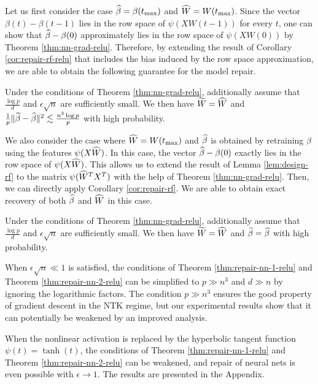 Let us first consider the case $\widehat{\beta}=\beta(t_{\max})$ and $\widehat{W}=W(t_{\max})$. Since the vector $\beta(t)-\beta(t-1)$ lies in the row space of $\psi(XW(t-1))$ for every $t$, one can show that $\widehat{\beta}-\beta(0)$ approximately lies in the row space of $\psi(XW(0))$ by Theorem \ref{thm:nn-grad-relu}. Therefore, by extending the result of Corollary \ref{cor:repair-rf-relu} that includes the bias induced by the row space approximation, we are able to obtain the following guarantee for the model repair.

\vskip10pt
\begin{thm}\label{thm:repair-nn-1-relu}
Under the conditions of Theorem \ref{thm:nn-grad-relu}, additionally assume that $\frac{\log p}{d}$ and $\epsilon\sqrt{n}$ are sufficiently small. We then have $\widetilde{W}=\widehat{W}$ and $\frac{1}{p}\|\widetilde{\beta}-\widehat{\beta}\|^2 \lesssim \frac{n^3\log p}{p}$ with high probability.
\end{thm}


We also consider the case where $\widehat{W}=W(t_{\max})$ and $\widehat{\beta}$ is obtained by retraining $\beta$ using the features $\psi(X\widehat{W})$. In this case, the vector $\widehat{\beta}-\beta(0)$ exactly lies in the row space of $\psi(X\widehat{W})$. This allows us to extend the result of Lemma \ref{lem:design-rf} to the matrix $\psi(\widehat{W}^TX^T)$ with the help of Theorem \ref{thm:nn-grad-relu}. Then, we can directly apply Corollary \ref{cor:repair-rf}. We are able to obtain exact recovery of both $\widehat{\beta}$ and $\widehat{W}$ in this case.

\vskip10pt
\begin{thm}\label{thm:repair-nn-2-relu}
Under the conditions of Theorem \ref{thm:nn-grad-relu}, additionally assume that $\frac{\log p}{d}$ and $\epsilon\sqrt{n}$ are sufficiently small. We then have $\widetilde{W}=\widehat{W}$ and $\widetilde{\beta}=\widehat{\beta}$ with high probability.
\end{thm}
\vskip10pt

\begin{remark}
When $\epsilon\sqrt{n}\ll 1$ is satisfied, the conditions of Theorem \ref{thm:repair-nn-1-relu} and Theorem \ref{thm:repair-nn-2-relu} can be simplified to $p\gg n^3$ and $d\gg n$ by ignoring the logarithmic factors. The condition $p\gg n^3$ ensures the good property of gradient descent in the NTK regime, but our experimental results show that it can potentially be weakened by an improved analysis.
\end{remark}

\begin{remark}
When the nonlinear activation is replaced by the hyperbolic tangent function $\psi(t)=\tanh(t)$, the conditions of Theorem \ref{thm:repair-nn-1-relu} and Theorem \ref{thm:repair-nn-2-relu} can be weakened, and repair of neural nets is even possible with $\epsilon\rightarrow 1$. The results are presented in the Appendix.
\end{remark}
